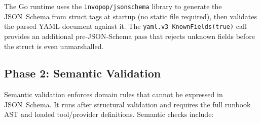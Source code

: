 The Go runtime uses the \texttt{invopop/jsonschema} library to generate the
JSON~Schema from struct tags at startup (no static file required), then validates
the parsed YAML document against it.  The \texttt{yaml.v3 KnownFields(true)}
call provides an additional pre-JSON-Schema pass that rejects unknown fields
before the struct is even unmarshalled.

\subsection{Phase 2: Semantic Validation}
\label{subsec:semantic}

Semantic validation enforces domain rules that cannot be expressed in
JSON~Schema.  It runs after structural validation and requires the full runbook
AST and loaded tool/provider definitions.  Semantic checks include:

